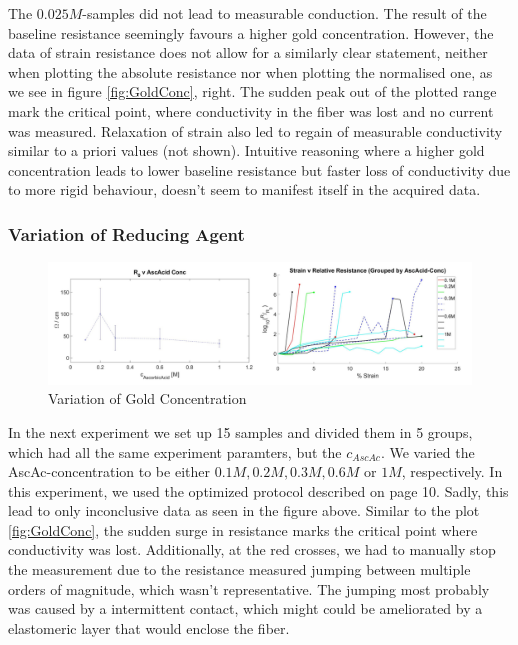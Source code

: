 The $0.025M$-samples did not lead to measurable conduction. The result of the baseline resistance seemingly favours a higher gold concentration. However, the data of strain resistance does not allow for a similarly clear statement, neither when plotting the absolute resistance nor when plotting the normalised one, as we see in figure \ref{fig:GoldConc}, right. The sudden peak out of the plotted range mark the critical point, where conductivity in the fiber was lost and no current was measured. Relaxation of strain also led to regain of measurable conductivity similar to a priori values (not shown). Intuitive reasoning where a higher gold concentration leads to lower baseline resistance but faster loss of conductivity due to more rigid behaviour, doesn't seem to manifest itself in the acquired data.

\subsubsection{Variation of Reducing Agent}


\begin{figure}[H]
    \centerline{\includegraphics[width=\textwidth]{./pic/StrainVAscAcidConc_2.PNG}}
    \caption{Variation of Gold Concentration}
    \label{fig:StrainVAscAcidConc}
\end{figure}


In the next experiment we set up 15 samples and divided them in 5 groups, which had all the same experiment paramters, but the $c_{AscAc}$.
We varied the AscAc-concentration to be either $0.1M, 0.2M, 0.3M, 0.6M$  or $1M$, respectively. In this experiment, we used the optimized protocol described on page 10. Sadly, this lead to only inconclusive data as seen in the figure above. Similar to the plot \ref{fig:GoldConc}, the sudden surge in resistance marks the critical point where conductivity was lost. Additionally, at the red crosses, we had to manually stop the measurement due to the resistance measured jumping between multiple orders of magnitude, which wasn't representative. The jumping most probably was caused by a intermittent contact, which might could be ameliorated by a elastomeric layer that would enclose the fiber. 